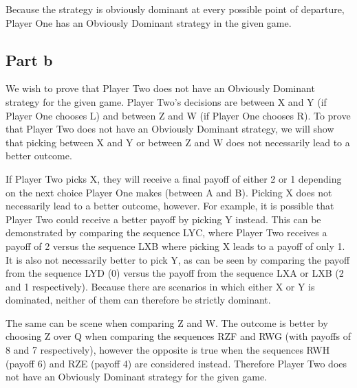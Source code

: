 \documentclass[12pt]{article}%
\begin{document}
Because the strategy is obviously dominant at every possible point of departure, Player One has an Obviously Dominant strategy in the given game.

\subsection*{Part b}
We wish to prove that Player Two does not have an Obviously Dominant strategy for the given game. Player Two's decisions are between X and Y (if Player One chooses L) and between Z and W (if Player One chooses R). To prove that Player Two does not have an Obviously Dominant strategy, we will show that picking between X and Y or between Z and W does not necessarily lead to a better outcome.

If Player Two picks X, they will receive a final payoff of either 2 or 1 depending on the next choice Player One makes (between A and B). Picking X does not necessarily lead to a better outcome, however. For example, it is possible that Player Two could receive a better payoff by picking Y instead. This can be demonstrated by comparing the sequence LYC, where Player Two receives a payoff of 2 versus the sequence LXB where picking X leads to a payoff of only 1. It is also not necessarily better to pick Y, as can be seen by comparing the payoff from the sequence LYD (0) versus the payoff from the sequence LXA or LXB (2 and 1 respectively). Because there are scenarios in which either X or Y is dominated, neither of them can therefore be strictly dominant.

The same can be scene when comparing Z and W. The outcome is better by choosing Z over Q when comparing the sequences RZF and RWG (with payoffs of 8 and 7 respectively), however the opposite is true when the sequences RWH (payoff 6) and RZE (payoff 4) are considered instead. Therefore Player Two does not have an Obviously Dominant strategy for the given game.
\end{document}
